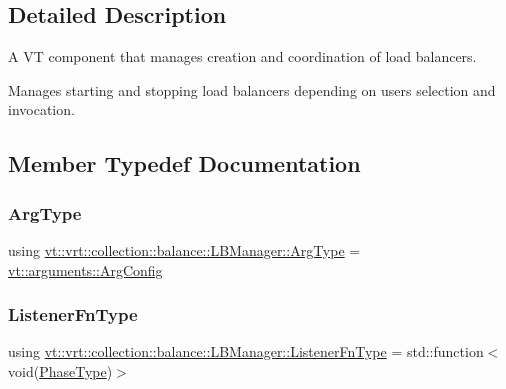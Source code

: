 \subsection{Detailed Description}
A VT component that manages creation and coordination of load balancers. 

Manages starting and stopping load balancers depending on user\textquotesingle{}s selection and invocation. 

\subsection{Member Typedef Documentation}
\mbox{\label{structvt_1_1vrt_1_1collection_1_1balance_1_1_l_b_manager_a25c1321de5a8a52b7c2c5d0d400d55d4}} 
\subsubsection{\texorpdfstring{Arg\+Type}{ArgType}}
{\footnotesize\ttfamily using \hyperlink{structvt_1_1vrt_1_1collection_1_1balance_1_1_l_b_manager_a25c1321de5a8a52b7c2c5d0d400d55d4}{vt\+::vrt\+::collection\+::balance\+::\+L\+B\+Manager\+::\+Arg\+Type} =  \hyperlink{structvt_1_1arguments_1_1_arg_config}{vt\+::arguments\+::\+Arg\+Config}}

\mbox{\label{structvt_1_1vrt_1_1collection_1_1balance_1_1_l_b_manager_a1bb65b50c7cefb8c139a9f40a83ca18b}} 
\subsubsection{\texorpdfstring{Listener\+Fn\+Type}{ListenerFnType}}
{\footnotesize\ttfamily using \hyperlink{structvt_1_1vrt_1_1collection_1_1balance_1_1_l_b_manager_a1bb65b50c7cefb8c139a9f40a83ca18b}{vt\+::vrt\+::collection\+::balance\+::\+L\+B\+Manager\+::\+Listener\+Fn\+Type} =  std\+::function$<$void(\hyperlink{namespacevt_a46ce6733d5cdbd735d561b7b4029f6d7}{Phase\+Type})$>$}



